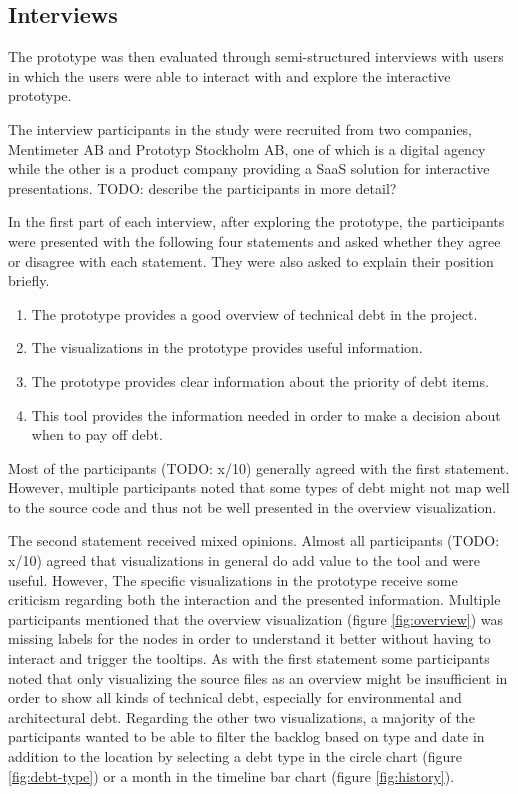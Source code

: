 \subsection{Interviews}

The prototype was then evaluated through semi-structured interviews with users in which the users were able to interact with and explore the interactive prototype.

The interview participants in the study were recruited from two companies, Mentimeter AB and Prototyp Stockholm AB, one of which is a digital agency while the other is a product company providing a SaaS solution for interactive presentations. TODO: describe the participants in more detail?

In the first part of each interview, after exploring the prototype, the participants were presented with the following four statements and asked whether they agree or disagree with each statement.
They were also asked to explain their position briefly.

\smallskip
\begin{enumerate}
  \item The prototype provides a good overview of technical debt in the project.
  \item The visualizations in the prototype provides useful information.
  \item The prototype provides clear information about the priority of debt items.
  \item This tool provides the information needed in order to make a decision about when to pay off debt.
\end{enumerate}
\smallskip

Most of the participants (TODO: x/10) generally agreed with the first statement.
However, multiple participants noted that some types of debt might not map well to the source code and thus not be well presented in the overview visualization.

The second statement received mixed opinions.
Almost all participants (TODO: x/10) agreed that visualizations in general do add value to the tool and were useful.
However, The specific visualizations in the prototype receive some criticism regarding both the interaction and the presented information. 
Multiple participants mentioned that the overview visualization (figure \ref{fig:overview}) was missing labels for the nodes in order to understand it better without having to interact and trigger the tooltips.
As with the first statement some participants noted that only visualizing the source files as an overview might be insufficient in order to show all kinds of technical debt, especially for environmental and architectural debt.
Regarding the other two visualizations, a majority of the participants wanted to be able to filter the backlog based on type and date in addition to the location by selecting a debt type in the circle chart (figure \ref{fig:debt-type}) or a month in the timeline bar chart (figure \ref{fig:history}).

